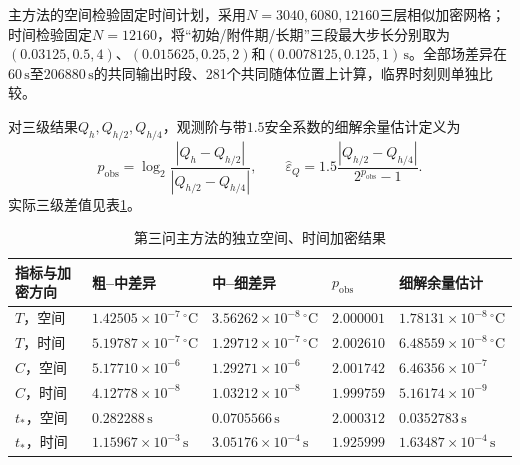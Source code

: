 \documentclass[withoutpreface,bwprint]{cumcmthesis}
\begin{document}
主方法的空间检验固定时间计划，采用$N=3040,6080,12160$三层相似加密网格；时间检验固定$N=12160$，将“初始/附件期/长期”三段最大步长分别取为$(0.03125,0.5,4)$、$(0.015625,0.25,2)$和$(0.0078125,0.125,1)\,\mathrm s$。全部场差异在$60\,\mathrm s$至$206880\,\mathrm s$的共同输出时段、281个共同随体位置上计算，临界时刻则单独比较。

对三级结果$Q_h,Q_{h/2},Q_{h/4}$，观测阶与带$1.5$安全系数的细解余量估计定义为\cite{roache1998}
\begin{equation}
p_{\mathrm{obs}}
=\log_2\frac{|Q_h-Q_{h/2}|}{|Q_{h/2}-Q_{h/4}|},
\qquad
\widehat\varepsilon_Q
=1.5\frac{|Q_{h/2}-Q_{h/4}|}{2^{p_{\mathrm{obs}}}-1}.
\label{eq:q3-richardson-estimate}
\end{equation}
实际三级差值见表\ref{tab:q3-convergence}。

\begin{table}[H]
\centering
\small
\renewcommand{\arraystretch}{1.15}
\caption{第三问主方法的独立空间、时间加密结果}
\label{tab:q3-convergence}
\begin{tabularx}{\textwidth}{>{\raggedright\arraybackslash}p{} >{\centering\arraybackslash}X >{\centering\arraybackslash}X >{\centering\arraybackslash}p{} >{\centering\arraybackslash}X}
\hline
指标与加密方向 & 粗--中差异 & 中--细差异 & $p_{\mathrm{obs}}$ & 细解余量估计\\
\hline
$T$，空间 & $1.42505\times10^{-7}\,{}^\circ\mathrm C$ & $3.56262\times10^{-8}\,{}^\circ\mathrm C$ & $2.000001$ & $1.78131\times10^{-8}\,{}^\circ\mathrm C$\\
$T$，时间 & $5.19787\times10^{-7}\,{}^\circ\mathrm C$ & $1.29712\times10^{-7}\,{}^\circ\mathrm C$ & $2.002610$ & $6.48559\times10^{-8}\,{}^\circ\mathrm C$\\
$C$，空间 & $5.17710\times10^{-6}$ & $1.29271\times10^{-6}$ & $2.001742$ & $6.46356\times10^{-7}$\\
$C$，时间 & $4.12778\times10^{-8}$ & $1.03212\times10^{-8}$ & $1.999759$ & $5.16174\times10^{-9}$\\
$t_*$，空间 & $0.282288\,\mathrm s$ & $0.0705566\,\mathrm s$ & $2.000312$ & $0.0352783\,\mathrm s$\\
$t_*$，时间 & $1.15967\times10^{-3}\,\mathrm s$ & $3.05176\times10^{-4}\,\mathrm s$ & $1.925999$ & $1.63487\times10^{-4}\,\mathrm s$\\
\hline
\end{tabularx}
\end{table}
\end{document}
